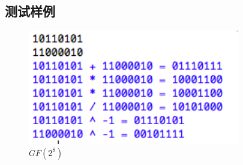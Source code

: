 \documentclass[11pt]{ctexart}
\begin{document}
\subsection{测试样例}
\begin{figure}[htbp]
\centering
\includegraphics[height=5cm,width=9.24cm]{gf256.png}
\caption{$GF(2^8)$}
\label{img_gf256}
\end{figure}
\end{document}
